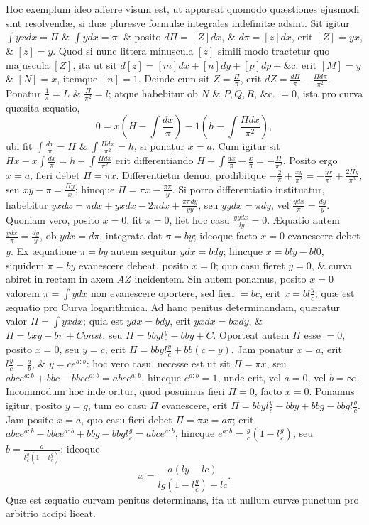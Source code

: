 Hoc exemplum ideo afferre visum est, ut appareat quomodo quæstiones ejusmodi sint resolvendæ, si duæ pluresve formulæ integrales indefinitæ adsint. Sit igitur $\int yxdx=\Pi$ \& $\int ydx=\pi$: \& posito $d\Pi=[Z]dx$, \& $d\pi=[z]dx$, erit $[Z]=yx$, \& $[z]=y$. Quod si nunc littera minuscula $[z]$ simili modo tractetur quo majuscula $[Z]$, ita ut sit $d[z]=[m]dx+[n]dy+[p]dp+\text{\&c.}$ erit $[M]=y$ \& $[N]=x$, itemque $[n]=1$. Deinde cum sit $Z=\frac{\Pi}{\pi}$, erit $dZ=\frac{d\Pi}{\pi}-\frac{\Pi d\pi}{\pi^2}$. Ponatur $\frac1\pi=L$ \& $\frac{\Pi}{\pi^2}=l$; atque habebitur ob $N$ \& $P,Q,R$, \&c. $=0$, ista pro curva quæsita æquatio,
\[0=x\left(H-\int\frac{dx}{\pi}\right)-1\left(h-\int\frac{\Pi dx}{\pi^2}\right),\]
ubi fit $\int\frac{dx}{\pi}=H$ \& $\int\frac{\Pi dx}{\pi^2}=h$, si ponatur $x=a$. Cum igitur sit $Hx-x\int\frac{dx}{\pi}=h-\int\frac{\Pi dx}{\pi^2}$ erit differentiando $H-\int\frac{dx}{\pi}-\frac x\pi=-\frac{\Pi}{\pi^2}$. Posito ergo $x=a$, fieri debet $\Pi=\pi x$. Differentietur denuo, prodibitque $-\frac2\pi+\frac{xy}{\pi^2}=-\frac{yx}{\pi^2}+\frac{2\Pi y}{\pi^3}$, seu $xy-\pi=\frac{\Pi y}{x}$; hincque $\Pi=\pi x-\frac{\pi\pi}y$. Si porro differentiatio instituatur, habebitur $yxdx=\pi dx+yxdx-2\pi dx+\frac{\pi\pi dy}{yy}$, seu $yydx=\pi dy$, vel $\frac{ydx}{\pi}=\frac{dy}y$. Quoniam vero,
posito $x=0$, fit $\pi=0$, fiet hoc casu $\frac{yydx}{dy}=0$. Æquatio autem $\frac{ydx}{\pi}=\frac{dy}y$, ob $ydx=d\pi$, integrata dat $\pi=by$; ideoque facto $x=0$ evanescere debet $y$. Ex æquatione $\pi=by$ autem sequitur $ydx=bdy$; hincque $x=bly-bl0$, siquidem $\pi=by$ evanescere debeat, posito $x=0$; quo casu fieret $y=0$, \& curva abiret in rectam in axem $AZ$ incidentem. Sin autem ponamus, posito $x=0$ valorem $\pi=\int ydx$ non evanescere oportere, sed fieri $=bc$, erit $x=bl\frac yc$, quæ est æquatio pro Curva logarithmica. Ad hanc penitus determinandam, quæratur valor $\Pi=\int yxdx$; quia est $ydx=bdy$, erit $yxdx=bxdy$, \& $\Pi=bxy-b\pi+\mathit{Const.}$ seu $\Pi=bbyl\frac yc-bby+C$. Oporteat autem $\Pi$ esse $=0$, posito $x=0$, seu $y=c$, erit $\Pi=bbyl\frac yc+bb(c-y)$. Jam ponatur $x=a$, erit $l\frac yc=\frac ab$, \& $y=ce^{a:b}$: hoc vero casu, necesse est ut sit $\Pi=\pi x$, seu $abce^{a:b}+bbc-bbce^{a:b}=abce^{a:b}$, hincque $e^{a:b}=1$, unde erit, vel $a=0$, vel $b=\infty$. Incommodum hoc inde oritur, quod posuimus fieri $\Pi=0$, facto $x=0$. Ponamus igitur, posito $y=g$, tum eo casu $\Pi$ evanescere, erit $\Pi=bbyl\frac yc-bby+bbg-bbgl\frac gc$. Jam posito $x=a$, quo casu fieri debet $\Pi=\pi x=a\pi$; erit $abce^{a:b}-bbce^{a:b}+bbg-bbgl\frac gc=abce^{a:b}$, hincque $e^{a:b}=\frac gc(1-l\frac gc)$, seu $b=\frac{a}{l\frac gc(1-l\frac gc)}$; ideoque
\[x=\frac{a(ly-lc)}{lg(1-l\frac gc)-lc}.\]
Quæ est æquatio curvam
penitus determinans, ita ut nullum curvæ punctum pro arbitrio accipi liceat.
